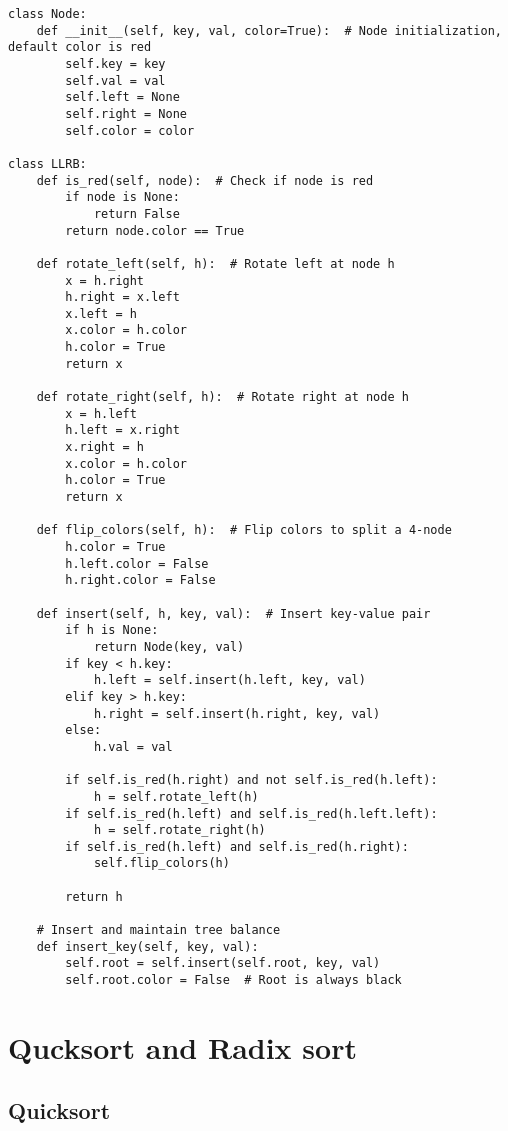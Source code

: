 \documentclass{article}
\begin{document}
\begin{verbatim}
class Node:
    def __init__(self, key, val, color=True):  # Node initialization, default color is red
        self.key = key
        self.val = val
        self.left = None
        self.right = None
        self.color = color

class LLRB:
    def is_red(self, node):  # Check if node is red
        if node is None:
            return False
        return node.color == True

    def rotate_left(self, h):  # Rotate left at node h
        x = h.right
        h.right = x.left
        x.left = h
        x.color = h.color
        h.color = True
        return x

    def rotate_right(self, h):  # Rotate right at node h
        x = h.left
        h.left = x.right
        x.right = h
        x.color = h.color
        h.color = True
        return x

    def flip_colors(self, h):  # Flip colors to split a 4-node
        h.color = True
        h.left.color = False
        h.right.color = False

    def insert(self, h, key, val):  # Insert key-value pair
        if h is None:
            return Node(key, val)
        if key < h.key:
            h.left = self.insert(h.left, key, val)
        elif key > h.key:
            h.right = self.insert(h.right, key, val)
        else:
            h.val = val

        if self.is_red(h.right) and not self.is_red(h.left):
            h = self.rotate_left(h)
        if self.is_red(h.left) and self.is_red(h.left.left):
            h = self.rotate_right(h)
        if self.is_red(h.left) and self.is_red(h.right):
            self.flip_colors(h)

        return h

    # Insert and maintain tree balance
    def insert_key(self, key, val):
        self.root = self.insert(self.root, key, val)
        self.root.color = False  # Root is always black
\end{verbatim}

\section{Qucksort and Radix sort}

\subsection{Quicksort}
\end{document}
